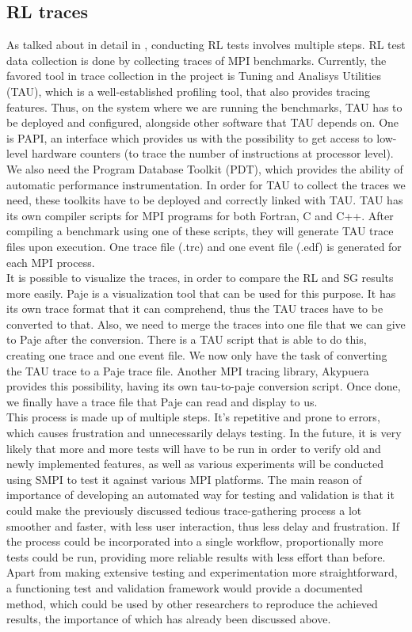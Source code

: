 \subsection{RL traces}
As talked about in detail in \cite{ms11}, conducting RL tests involves
multiple steps. RL test data collection is done by collecting traces
of MPI benchmarks. Currently, the favored tool in trace collection in
the project is Tuning and Analisys Utilities (TAU)\cite{sm06}, which
is a well-established profiling tool, that also provides tracing
features. Thus, on the system
where we are running the benchmarks, TAU has to be deployed and
configured, alongside other software that TAU depends on. One is
PAPI\cite{mbdh99}\cite{lmmsl01},
an interface which provides us with the possibility to
get access to low-level hardware counters (to trace the number of
instructions at processor level). We also need the Program Database
Toolkit (PDT)\cite{lcmsmrr00}, which provides the ability of automatic performance
instrumentation. In order for TAU to collect the traces we need, these
toolkits have to be deployed and correctly linked with TAU. TAU has
its own compiler scripts for MPI programs for both Fortran, C and
C++. After compiling a benchmark using one of these scripts, they will
generate TAU trace files upon execution. One trace file (.trc)
and one event file (.edf) is generated for each MPI process.\\
It is possible to visualize the traces, in order to compare the RL and SG
results more easily. Paje is a visualization tool that can be used for
this purpose. It has its own trace format that it can comprehend, thus
the TAU traces have to be converted to that. Also, we need to merge
the traces into one file that we can give to Paje after the
conversion. There is a
TAU script that is able to do this, creating one trace and one event
file. We now only have the task of converting the TAU trace to a Paje
trace file. Another MPI tracing library, Akypuera provides this
possibility, having its own tau-to-paje conversion script. Once done,
we finally have a trace file that Paje can read and display to us.\\
This process is made up of multiple steps. It's repetitive and prone
to errors, which causes frustration and unnecessarily delays testing.
In the future, it is very likely that more and more tests will have to
be run in order to verify old and newly implemented features, as well
as various experiments will be conducted using SMPI to test it against
various MPI platforms. The main reason of importance of developing an
automated way for testing and validation is that it could make the
previously discussed tedious trace-gathering process a lot smoother
and faster, with less user interaction, thus less delay and
frustration. If the process could be incorporated into a single
workflow, proportionally more tests could be run, providing more
reliable results with less effort than before. Apart from making
extensive testing and experimentation more straightforward, a
functioning test and validation framework would provide a
documented method, which could be used by other researchers to
reproduce the achieved results, the importance of which has already
been discussed above.

